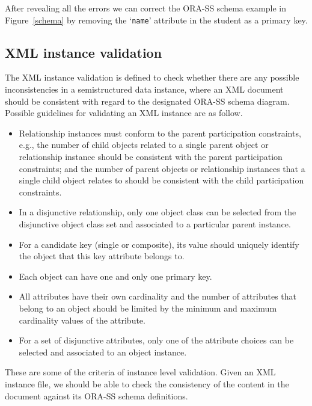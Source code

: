 \documentclass{entcs}
\begin{document}
After revealing all the errors we can correct the ORA-SS schema
example in Figure~\ref{schema} by removing the `\texttt{name}'
attribute in the student as a primary key. %

\subsection{XML instance validation}
The XML instance validation is defined to check whether there are
any possible inconsistencies in a semistructured data instance,
where an XML document should be consistent with regard to the
designated ORA-SS schema diagram. Possible guidelines for
validating an XML instance are as follow.
\begin{itemize}
 \item Relationship instances must conform to the parent participation
constraints, e.g., the number of child objects related to a single
parent object or relationship instance should be consistent with
the parent participation constraints; and the number of parent
objects or relationship instances that a single child object
relates to should be consistent with the child participation
constraints.
 \item  In a disjunctive relationship, only one object class can be
 selected from the disjunctive object class set and associated to a
 particular parent instance.
 \item For a candidate key (single or composite), its value should
 uniquely identify the object that this key attribute belongs to.
 \item Each object can have one and only one primary key.
 \item All attributes have their own cardinality and the number of attributes
that belong to an object should be limited by the minimum and
maximum cardinality values of the attribute.
 \item For a set of disjunctive attributes, only one of the attribute choices
 can be selected and associated to an object instance.
\end{itemize}
These are some of the criteria of instance level validation. Given
an XML instance file, we should be able to check the consistency
of the content in the document against its ORA-SS schema
definitions.
\end{document}
